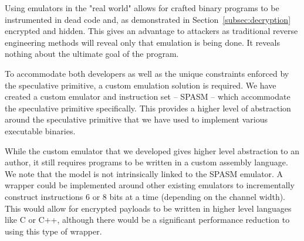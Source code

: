 Using emulators in the "real world" allows for crafted binary programs to be
instrumented in dead code and, as demonstrated in
Section~\ref{subsec:decryption} encrypted and hidden. This gives an advantage to
attackers as traditional reverse engineering methods will reveal only that
emulation is being done. It reveals nothing about the ultimate goal of the
program. 

To accommodate both developers as well as the unique constraints 
enforced by the speculative primitive, a custom emulation solution is required. 
We have created a custom emulator and instruction set -- SPASM -- which 
accommodate the speculative primitive specifically. This 
provides a higher level of abstraction around the speculative primitive
that we have used to implement various executable binaries. 


While the custom emulator that we developed gives higher level abstraction to
an author, it still requires programs to be written in a custom assembly language. 
We note that the \speculake model is not intrinsically linked to the SPASM emulator. 
A wrapper could be implemented around other existing emulators to incrementally 
construct instructions 6 or 8 bits at a time (depending on the channel width). 
This would allow for encrypted payloads to be written in higher level languages
like C or C++, although there would be a significant performance reduction to 
using this type of wrapper. 
